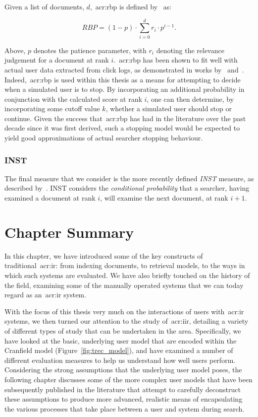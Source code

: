 Given a list of documents, $d$,~\gls{acr:rbp} is defined by~\cite{moffat2008rbp} as:

\begin{equation*}
RBP = (1 - p) \cdot \sum_{i=0}^{d}r_i \cdot p^{i-1}.
\end{equation*}

Above, $p$ denotes the patience parameter, with $r_i$ denoting the relevance judgement for a document at rank $i$.~\gls{acr:rbp} has been shown to fit well with actual user data extracted from click logs, as demonstrated in works by~\cite{chapelle2009rbp} and~\cite{zhang2010click_rbp}. Indeed,~\gls{acr:rbp} is used within this thesis as a means for attempting to decide when a simulated user is to stop. By incorporating an additional probability in conjunction with the calculated score at rank $i$, one can then determine, by incorporating some cutoff value $k$, whether a simulated user should stop or continue. Given the success that~\gls{acr:rbp} has had in the literature over the past decade since it was first derived, such a stopping model would be expected to yield good approximations of actual searcher stopping behaviour.

\subsubsection{INST}
The final measure that we consider is the more recently defined \emph{INST} measure, as described by~\cite{bailey2015inst, moffat2015inst}. INST considers the \emph{conditional probability} that a searcher, having examined a document at rank $i$, will examine the next document, at rank $i+1$.


\section{Chapter Summary}
In this chapter, we have introduced some of the key constructs of traditional~\gls{acr:ir}: from indexing documents, to retrieval models, to the ways in which such systems are evaluated. We have also briefly touched on the history of the field, examining some of the manually operated systems that we can today regard as an~\gls{acr:ir} system.

With the focus of this thesis very much on the interactions of users with~\gls{acr:ir} systems, we then turned our attention to the study of~\gls{acr:iir}, detailing a variety of different types of study that can be undertaken in the area. Specifically, we have looked at the basic, underlying user model that are encoded within the Cranfield model (Figure~\ref{fig:trec_model}), and have examined a number of different evaluation measures to help us understand how well users perform. Considering the strong assumptions that the underlying user model poses, the following chapter discusses some of the more complex user models that have been subsequently published in the literature that attempt to carefully deconstruct these assumptions to produce more advanced, realistic means of encapsulating the various processes that take place between a user and system during search.


